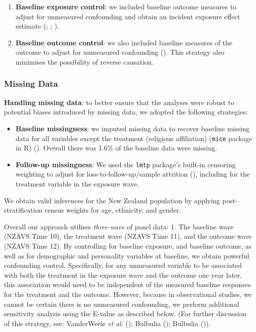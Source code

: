 \documentclass[
  singlecolumn]{article}
\begin{document}
\begin{enumerate}
\def\labelenumi{\arabic{enumi}.}
\setcounter{enumi}{3}
\item
  \textbf{Baseline exposure control}: we included baseline outcome
  measures to adjust for unmeasured confounding and obtain an incident
  exposure effect estimate (; ;
  ).
\item
  \textbf{Baseline outcome control}: we also included baseline measures
  of the outcome to adjust for unmeasured confounding
  (). This
  strategy also minimises the possibility of reverse causation.
\end{enumerate}

\subsubsection{Missing Data}\label{missing-data}

\textbf{Handling missing data}: to better ensure that the analyses were
robust to potential biases introduced by missing data, we adopted the
following strategies:

\begin{itemize}
\item
  \textbf{Baseline missingness}: we imputed missing data to recover
  baseline missing data for all variables except the treatment
  (religious affiliation) (\texttt{mice} package in R)
  (). Overall there was
  1.6\% of the baseline data were missing.
\item
  \textbf{Follow-up missingness}: We used the \texttt{lmtp} package's
  built-in censoring weighting to adjust for loss-to-follow-up/sample
  attrition (),
  including for the treatment variable in the exposure wave.
\end{itemize}

We obtain valid inferences for the New Zealand population by applying
post-stratification census weights for age, ethnicity, and gender.

Overall our approach utilises \emph{three-wave} of panel data: 1. The
baseline wave (NZAVS Time 10), the treatment wave (NZAVS Time 11), and
the outcome wave (NZAVS Time 12). By controlling for baseline exposure,
and baseline outcome, as well as for demographic and personality
variables at baseline, we obtain powerful confounding control.
Specifically, for any unmeasured variable to be associated with both the
treatment in the exposure wave and the outcome one year later, this
association would need to be independent of the measured baseline
responses for the treatment and the outcome. However, because in
observational studies, we cannot be certain there is no unmeasured
confounding, we perform additional sensitivity analysis using the
E-value as described below. (For further discussion of this strategy,
see: VanderWeele \emph{et al.} ();
Bulbulia (); Bulbulia
()).
\end{document}
